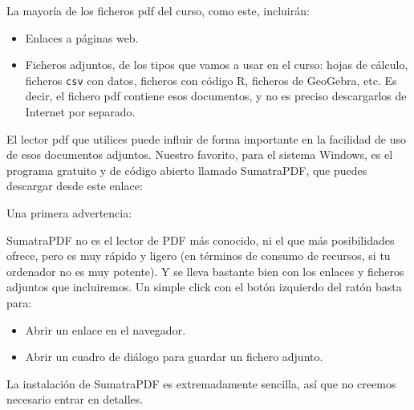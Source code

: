 \documentclass[10pt,a4paper]{article}\usepackage[]{graphicx}\usepackage[]{color}
\newcounter {cont01}
\begin{document}
La mayoría de los ficheros pdf del curso, como este, incluirán:
\begin{itemize}
  \item Enlaces a páginas web.
  \item Ficheros adjuntos, de los tipos que vamos a usar en el curso: hojas de cálculo, ficheros
      {\tt csv}  con datos, ficheros con código R, ficheros de GeoGebra, etc.  Es decir, el
      fichero pdf contiene esos documentos, y no es preciso descargarlos de Internet por
      separado.
\end{itemize}
El lector pdf que utilices puede influir de forma importante en la facilidad de uso de esos
documentos adjuntos. Nuestro favorito, para el sistema Windows, es el programa gratuito y de código
abierto llamado SumatraPDF, que puedes descargar desde este enlace:
\begin{center}
\end{center}

Una primera advertencia:
        \begin{center}
        \end{center}



SumatraPDF no es el lector de PDF más conocido, ni el que más posibilidades ofrece, pero es muy
rápido y ligero (en términos de consumo de recursos, si tu ordenador no es muy potente). Y se lleva
bastante bien con los enlaces y ficheros adjuntos que incluiremos. Un simple click con el botón
izquierdo del ratón basta para:
\begin{itemize}
  \item Abrir un enlace en el navegador.
  \item Abrir un cuadro de diálogo para guardar un fichero adjunto.
\end{itemize}
La instalación de SumatraPDF es extremadamente sencilla, así que no creemos necesario entrar en
detalles.
\end{document}
